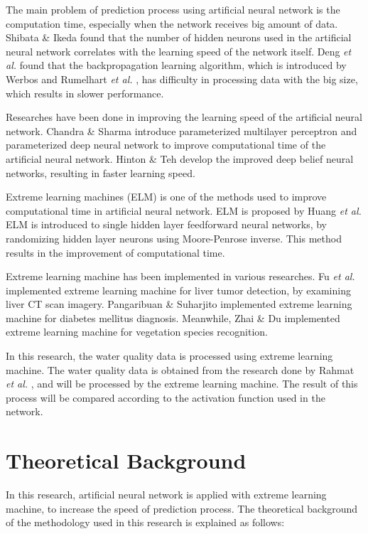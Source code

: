 \documentclass[journal,comsoc]{IEEEtran}
\begin{document}
The main problem of prediction process using artificial neural network is the computation time, especially when the network receives big amount of data. Shibata \& Ikeda \cite{Shibata09} found that the number of hidden neurons used in the artificial neural network correlates with the learning speed of the network itself. Deng \textit{et al.} \cite{Deng15} found that the backpropagation learning algorithm, which is introduced by Werbos \cite{Werbos74} and Rumelhart \textit{et al.} \cite{Rumelhart86}, has difficulty in processing data with the big size, which results in slower performance.

Researches have been done in improving the learning speed of the artificial neural network. Chandra \& Sharma introduce parameterized multilayer perceptron \cite{Chandra14} and parameterized deep neural network \cite{Chandra16} to improve computational time of the artificial neural network. Hinton \& Teh \cite{Hinton06} develop the improved deep belief neural networks, resulting in faster learning speed.

Extreme learning machines (ELM) is one of the methods used to improve computational time in artificial neural network. ELM is proposed by Huang \textit{et al.} \cite{Huang06} ELM is introduced to single hidden layer feedforward neural networks, by randomizing hidden layer neurons using Moore-Penrose inverse. This method results in the improvement of computational time.

Extreme learning machine has been implemented in various researches. Fu \textit{et al.} \cite{Fu15} implemented extreme learning machine for liver tumor detection, by examining liver CT scan imagery. Pangaribuan \& Suharjito \cite{Pangaribuan14} implemented extreme learning machine for diabetes mellitus diagnosis. Meanwhile, Zhai \& Du \cite{Zhai08} implemented extreme learning machine for vegetation species recognition.

In this research, the water quality data is processed using extreme learning machine. The water quality data is obtained from the research done by Rahmat \textit{et al.} \cite{Rahmat16}, and will be processed by the extreme learning machine. The result of this process will be compared according to the activation function used in the network.

\section{Theoretical Background}

In this research, artificial neural network is applied with extreme learning machine, to increase the speed of prediction process. The theoretical background of the methodology used in this research is explained as follows:
\end{document}
